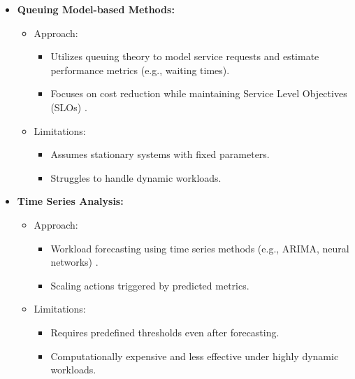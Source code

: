 \documentclass[conference]{IEEEtran}
\begin{document}
\begin{itemize}
    \item \textbf{Queuing Model-based Methods:}
    \begin{itemize}
        \item Approach:
        \begin{itemize}
            \item Utilizes queuing theory to model service requests and estimate performance metrics (e.g., waiting times).
            \item Focuses on cost reduction while maintaining Service Level Objectives (SLOs) \cite{gergin2014performance, danilo2018hierarchical}.
        \end{itemize}
        \item Limitations:
        \begin{itemize}
            \item Assumes stationary systems with fixed parameters.
            \item Struggles to handle dynamic workloads.
        \end{itemize}
    \end{itemize}
    
    \item \textbf{Time Series Analysis:}
    \begin{itemize}
        \item Approach:
        \begin{itemize}
            \item Workload forecasting using time series methods (e.g., ARIMA, neural networks) \cite{calheiros2014arima, kumar2018neural}.
            \item Scaling actions triggered by predicted metrics.
        \end{itemize}
        \item Limitations:
        \begin{itemize}
            \item Requires predefined thresholds even after forecasting.
            \item Computationally expensive and less effective under highly dynamic workloads.
        \end{itemize}
    \end{itemize}
    

\end{itemize}
\end{document}
